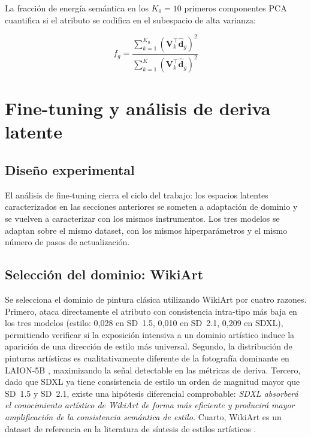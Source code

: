 \documentclass[12pt, a4paper, twoside]{book}
\begin{document}
La fracción de energía semántica en los $K_0 = 10$ primeros componentes PCA cuantifica si el atributo se codifica en el subespacio de alta varianza:

\begin{equation}
f_g = \frac{\sum_{k=1}^{K_0} (\mathbf{V}_k^\top \hat{\mathbf{d}}_g)^2}{\sum_{k=1}^{K} (\mathbf{V}_k^\top \hat{\mathbf{d}}_g)^2}
\end{equation}

\section{Fine-tuning y análisis de deriva latente}
\label{sec:metodos:finetune}

\subsection{Diseño experimental}

El análisis de fine-tuning cierra el ciclo del trabajo: los espacios latentes caracterizados en las secciones anteriores se someten a adaptación de dominio y se vuelven a caracterizar con los mismos instrumentos. Los tres modelos se adaptan sobre el mismo dataset, con los mismos hiperparámetros y el mismo número de pasos de actualización.

\subsection{Selección del dominio: WikiArt}

Se selecciona el dominio de pintura clásica utilizando WikiArt \citep{saleh2015wikiart} por cuatro razones. Primero, ataca directamente el atributo con consistencia intra-tipo más baja en los tres modelos (estilo: 0,028 en SD~1.5, 0,010 en SD~2.1, 0,209 en SDXL), permitiendo verificar si la exposición intensiva a un dominio artístico induce la aparición de una dirección de estilo más universal. Segundo, la distribución de pinturas artísticas es cualitativamente diferente de la fotografía dominante en LAION-5B \citep{schuhmann2022laion}, maximizando la señal detectable en las métricas de deriva. Tercero, dado que SDXL ya tiene consistencia de estilo un orden de magnitud mayor que SD~1.5 y SD~2.1, existe una hipótesis diferencial comprobable: \textit{SDXL absorberá el conocimiento artístico de WikiArt de forma más eficiente y producirá mayor amplificación de la consistencia semántica de estilo.} Cuarto, WikiArt es un dataset de referencia en la literatura de síntesis de estilos artísticos \citep{gatys2016style}.
\end{document}
